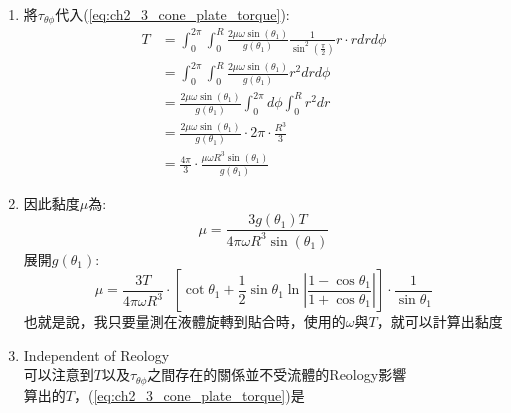 \documentclass[../main.tex]{subfiles}
\begin{document}
\begin{itemize}
\begin{enumerate}
\begin{align}
        \frac{-\sin^2\theta - 2\cos^2\theta}{\sin^3\theta}
        - \frac{\sin\theta}{\sin^2\theta}\right] \nonumber\\
      &=-\frac{\mu\omega\sin(\theta_1)}{g(\theta_1)}\sin\theta\cdot\left(
        \frac{-2\cos^2\theta - 2\sin^2\theta}{\sin^3\theta}
      \right) \nonumber\\
      &=-\frac{\mu\omega\sin(\theta_1)}{g(\theta_1)}\sin\theta\cdot\left(
        \frac{-2}{\sin^3\theta}
      \right) \nonumber\\
      & = \frac{2\mu\omega\sin(\theta_1)}{g(\theta_1)}\frac{1}{\sin^2\theta} \label{eq:ch2_3_cone_plate_shear}
    \end{align}
    \item 將$\tau_{\theta\phi}$代入(\ref{eq:ch2_3_cone_plate_torque}):
    \begin{align}
      T &= \int_0^{2\pi} \int_0^R \frac{2\mu\omega\sin(\theta_1)}{g(\theta_1)}\frac{1}{\sin^2\left(\frac{\pi}{2}\right)} r \cdot r dr d\phi \nonumber\\
      &= \int_0^{2\pi} \int_0^R \frac{2\mu\omega\sin(\theta_1)}{g(\theta_1)} r^2 dr d\phi \nonumber\\
      &= \frac{2\mu\omega\sin(\theta_1)}{g(\theta_1)} \int_0^{2\pi} d\phi \int_0^R r^2 dr \nonumber\\
      &= \frac{2\mu\omega\sin(\theta_1)}{g(\theta_1)} \cdot 2\pi \cdot \frac{R^3}{3} \nonumber\\
      &= \frac{4\pi}{3} \cdot \frac{\mu\omega R^3 \sin(\theta_1)}{g(\theta_1)}
    \end{align}
    \item 因此黏度$\mu$為:
    \begin{equation}
      \boxed{\mu = \frac{3g(\theta_1)T}{4\pi \omega R^3 \sin(\theta_1)} }
    \end{equation}
    展開$g(\theta_1)$:
    \begin{equation}
      \mu = \frac{3T}{4\pi \omega R^3} \cdot
      \left[\cot\theta_1 + \frac{1}{2}\sin\theta_1 \ln\left|\frac{1-\cos\theta_1}{1+\cos\theta_1}\right|\right]
      \cdot \frac{1}{\sin\theta_1}
    \end{equation}
    也就是說，我只要量測在液體旋轉到貼合時，使用的$\omega$與$T$，就可以計算出黏度
    \item Independent of Reology\\
    可以注意到$T$以及$\tau_{\theta\phi}$之間存在的關係並不受流體的Reology影響\\
    算出的$T$，(\ref{eq:ch2_3_cone_plate_torque})是
    \begin{equation}

\end{equation}
\end{enumerate}
\end{itemize}
\end{document}
